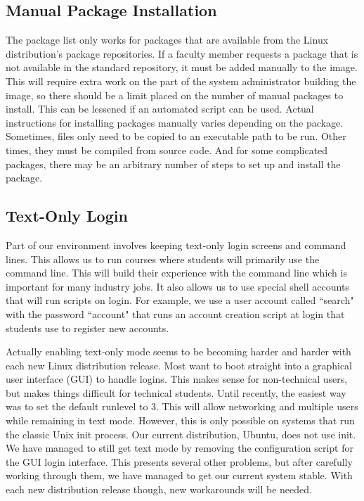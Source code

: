 \subsection{Manual Package Installation}
The package list only works for packages that are available from the Linux distribution's package repositories.  If a faculty member requests a package that is not available in the standard repository, it must be added manually to the image.  This will require extra work on the part of the system administrator building the image, so there should be a limit placed on the number of manual packages to install.  This can be lessened if an automated script can be used.  Actual instructions for installing packages manually varies depending on the package.  Sometimes, files only need to be copied to an executable path to be run.  Other times, they must be compiled from source code.  And for some complicated packages, there may be an arbitrary number of steps to set up and install the package.  

\subsection{Text-Only Login}
Part of our environment involves keeping text-only login screens and command lines.  This allows us to run courses where students will primarily use the command line.  This will build their experience with the command line which is important for many industry jobs.  It also allows us to use special shell accounts that will run scripts on login.  For example, we use a user account called ``search" with the password ``account" that runs an account creation script at login that students use to register new accounts.  

Actually enabling text-only mode seems to be becoming harder and harder with each new Linux distribution release.  Most want to boot straight into a graphical user interface (GUI) to handle logins.  This makes sense for non-technical users, but makes things difficult for technical students.  Until recently, the easiest way was to set the default runlevel to 3.  This will allow networking and multiple users while remaining in text mode.  However, this is only possible on systems that run the classic Unix init process.  Our current distribution, Ubuntu, does not use init.  We have managed to still get text mode by removing the configuration script for the GUI login interface.  This presents several other problems, but after carefully working through them, we have managed to get our current system stable.  With each new distribution release though, new workarounds will be needed.

